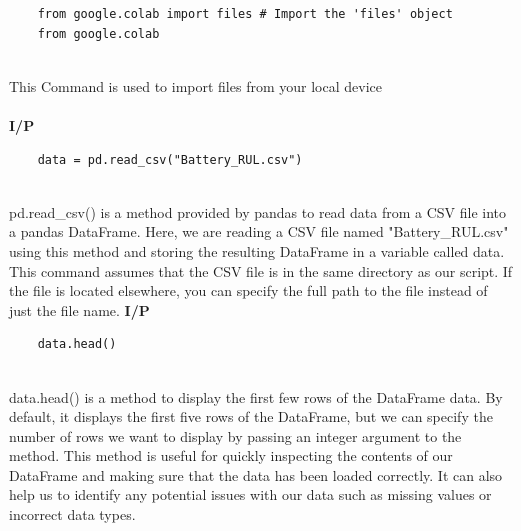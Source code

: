 \begin{verbatim}
    from google.colab import files # Import the 'files' object
    from google.colab
\end{verbatim}
\\
This Command is used to import files from your local device \\
\\
\noindent
\textbf{I/P} \\[-2.5em] %

\begin{verbatim}
    data = pd.read_csv("Battery_RUL.csv") 
\end{verbatim}
\\
pd.read\_csv() is a method provided by pandas to read data from a CSV file into a pandas DataFrame. Here, we are reading a CSV file named "Battery\_RUL.csv" using this method and storing the resulting DataFrame in a variable called data. This command assumes that the CSV file is in the same directory as our script. If the file is located elsewhere, you can specify the full path to the file instead of just the file name.
\newpage
\noindent
\textbf{I/P} \\[-1.5em] %

\begin{verbatim}
    data.head() 
\end{verbatim}
\\
data.head() is a method to display the first few rows of the DataFrame data. By default, it 
displays the first five rows of the DataFrame, but we can specify the number of rows we want 
to display by passing an integer argument to the method. 
This method is useful for quickly inspecting the contents of our DataFrame and making sure 
that the data has been loaded correctly. It can also help us to identify any potential issues with 
our data such as missing values or incorrect data types.

